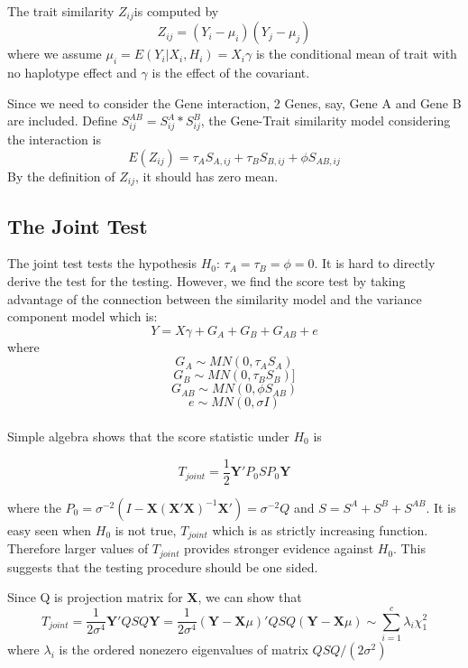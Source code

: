 \documentclass{article}
\newcommand{\Y}{\mathbf{Y}}
\newcommand{\X}{\mathbf{X}}
\begin{document}
         The trait similarity $Z_{ij}$is computed by
         \begin{equation*}
            Z_{ij}=(Y_i-\mu_i)(Y_j-\mu_j)
         \end{equation*}
         where we assume $\mu_i=E(Y_i|X_i,H_i)=X_i\gamma$ is the conditional mean of trait with no haplotype effect and $\gamma$ is the effect of the covariant.

         Since we need to consider the Gene interaction, 2 Genes, say, Gene A and Gene B are included. Define $S^{AB}_{ij}=S^A_{ij}*S^B_{ij}$, the Gene-Trait similarity model considering the interaction is
         \begin{equation*}
            E(Z_{ij})=\tau_AS_{A,ij}+\tau_BS_{B,ij}+\phi S_{AB,ij}
         \end{equation*}
        By the definition of $Z_{ij}$, it should has zero mean.

        \subsection{The Joint Test}
        The joint test tests the hypothesis $H_0$: $\tau_A=\tau_B=\phi=0$. It is hard to directly derive the test for the testing. However, we find the score test by taking advantage of the connection between the similarity model and the variance component model which is:
        \begin{equation*}
            Y=X\gamma+G_A+G_B+G_{AB}+e
        \end{equation*}
        where
        \[G_A   \sim   MN(0, \tau_AS_A)\]
        \[G_B   \sim   MN(0, \tau_BS_B)]\]
        \[G_{AB}\sim   MN(0, \phi S_{AB})\]
        \[e     \sim   MN(0,\sigma I)\]\\

        Simple algebra shows that the score statistic under $H_0$ is

        \[
            T_{joint}=\frac{1}{2}\Y'P_0SP_0\Y
        \]

        where the $P_0=\sigma^{-2}(I-\X(\X'\X)^{-1}\X')=\sigma^{-2}Q$ and $S=S^A+S^B+S^{AB}$. It is easy seen when $H_0$ is not true, $T_{joint}$ which is as strictly increasing function. Therefore larger values of $T_{joint}$ provides stronger evidence against $H_0$. This suggests that the testing procedure should be one sided.

        Since Q is projection matrix for $\X$, we can show that
        \[
            T_{joint}=\frac{1}{2\sigma^4}\Y'QSQ\Y=\frac{1}{2\sigma^4}(\Y-\X\mu)'QSQ(\Y-\X\mu)\sim\sum_{i=1}^c\lambda_i\chi^2_1
        \]
        where $\lambda_i$ is the ordered nonezero eigenvalues of matrix $QSQ/(2\sigma^2)$
\end{document}
